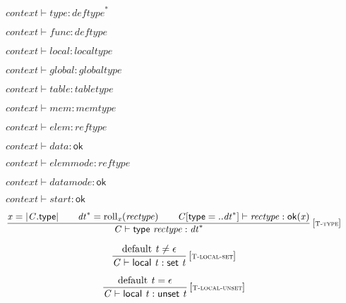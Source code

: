 \vspace{1ex}

$\boxed{{\mathit{context}} \vdash {\mathit{type}} : {{\mathit{deftype}}^\ast}}$

$\boxed{{\mathit{context}} \vdash {\mathit{func}} : {\mathit{deftype}}}$

$\boxed{{\mathit{context}} \vdash {\mathit{local}} : {\mathit{localtype}}}$

$\boxed{{\mathit{context}} \vdash {\mathit{global}} : {\mathit{globaltype}}}$

$\boxed{{\mathit{context}} \vdash {\mathit{table}} : {\mathit{tabletype}}}$

$\boxed{{\mathit{context}} \vdash {\mathit{mem}} : {\mathit{memtype}}}$

$\boxed{{\mathit{context}} \vdash {\mathit{elem}} : {\mathit{reftype}}}$

$\boxed{{\mathit{context}} \vdash {\mathit{data}} : \mathsf{ok}}$

$\boxed{{\mathit{context}} \vdash {\mathit{elemmode}} : {\mathit{reftype}}}$

$\boxed{{\mathit{context}} \vdash {\mathit{datamode}} : \mathsf{ok}}$

$\boxed{{\mathit{context}} \vdash {\mathit{start}} : \mathsf{ok}}$

$$
\begin{array}{@{}c@{}}\displaystyle
\frac{
{\mathit{x}} = {|{\mathit{C}}.\mathsf{type}|}
 \qquad
{{\mathit{dt}}^\ast} = {{\mathrm{roll}}}_{{\mathit{x}}}({\mathit{rectype}})
 \qquad
{\mathit{C}}[\mathsf{type} = ..{{\mathit{dt}}^\ast}] \vdash {\mathit{rectype}} : {\mathsf{ok}}{({\mathit{x}})}
}{
{\mathit{C}} \vdash \mathsf{type}~{\mathit{rectype}} : {{\mathit{dt}}^\ast}
} \, {[\textsc{\scriptsize T{-}type}]}
\qquad
\end{array}
$$

$$
\begin{array}{@{}c@{}}\displaystyle
\frac{
{\mathrm{default}}~{\mathit{t}} \neq \epsilon
}{
{\mathit{C}} \vdash \mathsf{local}~{\mathit{t}} : \mathsf{set}~{\mathit{t}}
} \, {[\textsc{\scriptsize T{-}local{-}set}]}
\qquad
\end{array}
$$

$$
\begin{array}{@{}c@{}}\displaystyle
\frac{
{\mathrm{default}}~{\mathit{t}} = \epsilon
}{
{\mathit{C}} \vdash \mathsf{local}~{\mathit{t}} : \mathsf{unset}~{\mathit{t}}
} \, {[\textsc{\scriptsize T{-}local{-}unset}]}
\qquad
\end{array}
$$

